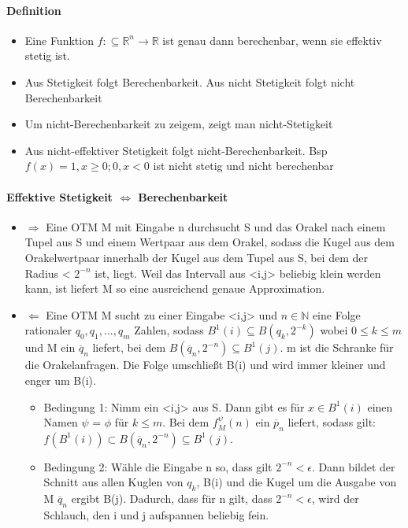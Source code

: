 \documentclass[ngerman]{scrartcl}
\begin{document}
\paragraph{Definition}
\begin{itemize}
  \item Eine Funktion $ f: \subseteq \mathbb{R}^n \rightarrow \mathbb{R} $ ist genau dann berechenbar, wenn sie effektiv stetig ist.
  \item Aus Stetigkeit folgt Berechenbarkeit. Aus nicht Stetigkeit folgt nicht Berechenbarkeit
  \item Um nicht-Berechenbarkeit zu zeigem, zeigt man nicht-Stetigkeit
  \item Aus nicht-effektiver Stetigkeit folgt nicht-Berechenbarkeit. Bsp $  f(x) = 1, x \geq 0; 0, x < 0 $ ist nicht stetig und nicht berechenbar
\end{itemize}

\paragraph{Effektive Stetigkeit $ \Leftrightarrow $ Berechenbarkeit}
\begin{itemize}
  \item $ \Rightarrow $ Eine OTM M mit Eingabe n durchsucht S und das Orakel nach einem Tupel aus S und einem Wertpaar aus dem Orakel, sodass die Kugel aus dem Orakelwertpaar innerhalb der Kugel aus dem Tupel aus S, bei dem der Radius < $ 2^{-n}$ ist, liegt. Weil das Intervall aus <i,j> beliebig klein werden kann, ist liefert M so eine ausreichend genaue Approximation.
  \item $ \Leftarrow $ Eine OTM M sucht zu einer Eingabe <i,j>  und $ n\in \mathbb{N}$ eine Folge rationaler $ q_0,q_1,...,q_m$ Zahlen, sodass $ B^1(i) \subseteq B(q_k, 2^{-k}) $ wobei $ 0 \leq k \leq m $ und M ein $ \overline{q}_n $ liefert, bei dem $ B(\overline{q}_n, 2^{-n}) \subseteq B^1(j)$. m ist die Schranke für die Orakelanfragen. Die Folge umschließt B(i) und wird immer kleiner und enger um B(i).
  \begin{itemize}
    \item Bedingung 1: Nimm ein <i,j> aus S. Dann gibt es für $ x \in B^1(i) $ einen Namen $ \psi $ = $ \phi $ für $ k \leq m $. Bei dem $ f^\psi_M (n) $ ein $ \overline{p}_n $ liefert, sodass gilt: $ f(B^1(i)) \subset B(\overline{q}_n, 2^{-n}) \subseteq B^1(j) $.
    \item Bedingung 2: Wähle die Eingabe n so, dass gilt $ 2^{-n} < \epsilon $. Dann bildet der Schnitt aus allen Kuglen von $q_k$, B(i) und die Kugel um die Ausgabe von M $ \overline{q}_n $ ergibt B(j). Dadurch, dass für n gilt, dass $ 2^{-n} < \epsilon$, wird der Schlauch, den i und j aufspannen beliebig fein.
  \end{itemize}

\end{itemize}
\end{document}

